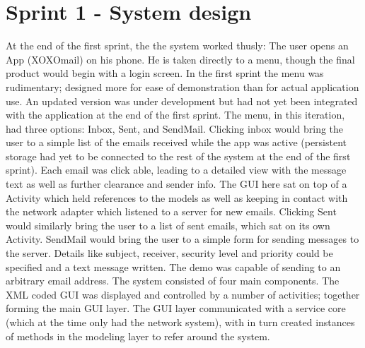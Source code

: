 \section{Sprint 1 - System design}
At the end of the first sprint, the the system worked thusly: The user opens an App (XOXOmail) on his phone. He is taken directly to a menu, though the final product would begin with a login screen. In the first sprint the menu was rudimentary; designed more for ease of demonstration than for actual application use. An updated version was under development but had not yet been integrated with the application at the end of the first sprint. The menu, in this iteration, had three options: Inbox, Sent, and SendMail.
\newline
\newline
Clicking inbox would bring the user to a simple list of the emails received while the app was active (persistent storage had yet to be connected to the rest of the system at the end of the first sprint). Each email was click able, leading to a detailed view with the message text as well as further clearance and sender info. The GUI here sat on top of a Activity which held references to the models as well as keeping in contact with the network adapter which listened to a server for new emails. Clicking Sent would similarly bring the user to a list of sent emails, which sat on its own Activity.
\newline
\newline
SendMail would bring the user to a simple form for sending messages to the server. Details like subject, receiver, security level and priority could be specified and a text message written. The demo was capable of sending to an arbitrary email address.
\newline
\newline
The system consisted of four main components. The XML coded GUI was displayed and controlled by a number of activities; together forming the main GUI layer. The GUI layer communicated with a service core (which at the time only had the network system), with in turn created instances of methods in the modeling layer to refer around the system.